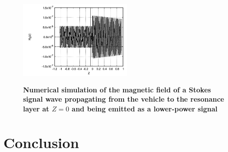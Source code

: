 \documentclass[twocolumn]{article}
\begin{document}
			\begin{figure}[t]
				\centering
					\includegraphics[width = 0.5\textwidth]{Images/Stokes_NumericalSim2.png}
					\label{subfig:Stokes2}
				\caption{\textbf{Numerical simulation of the magnetic field of a Stokes signal wave propagating from the vehicle to the resonance layer at $Z=0$ and being emitted as a lower-power signal}}
				\label{fig:}
			\end{figure}

\section*{Conclusion}



\end{document}
